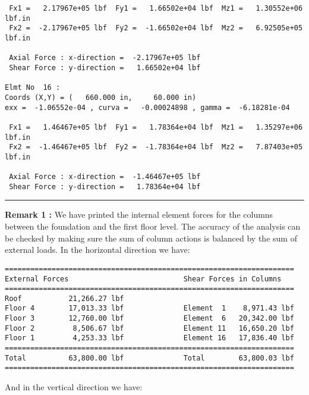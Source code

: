 \begin{footnotesize}
\begin{verbatim}
 Fx1 =   2.17967e+05 lbf  Fy1 =   1.66502e+04 lbf  Mz1 =   1.30552e+06 lbf.in
 Fx2 =  -2.17967e+05 lbf  Fy2 =  -1.66502e+04 lbf  Mz2 =   6.92505e+05 lbf.in

 Axial Force : x-direction =  -2.17967e+05 lbf
 Shear Force : y-direction =   1.66502e+04 lbf

Elmt No  16 : 
Coords (X,Y) = (   660.000 in,     60.000 in)
exx =  -1.06552e-04 , curva =   -0.00024898 , gamma =  -6.18281e-04

 Fx1 =   1.46467e+05 lbf  Fy1 =   1.78364e+04 lbf  Mz1 =   1.35297e+06 lbf.in
 Fx2 =  -1.46467e+05 lbf  Fy2 =  -1.78364e+04 lbf  Mz2 =   7.87403e+05 lbf.in

 Axial Force : x-direction =  -1.46467e+05 lbf
 Shear Force : y-direction =   1.78364e+04 lbf
\end{verbatim}
\rule{6.25 in}{0.035 in}
\end{footnotesize}

\vspace{0.15 in}\noindent
{\bf Remark 1 :} We have printed the internal element forces for the
columns between the foundation and the first floor level. The accuracy of
the analysis can be checked by making sure the sum of column actions 
is balanced by the sum of external loads.
In the horizontal direction we have:

\begin{footnotesize}
\begin{verbatim}
====================================================================
External Forces                           Shear Forces in Columns
====================================================================
Roof           21,266.27 lbf                
Floor 4        17,013.33 lbf              Element  1    8,971.43 lbf
Floor 3        12,760.00 lbf              Element  6   20,342.00 lbf
Floor 2         8,506.67 lbf              Element 11   16,650.20 lbf
Floor 1         4,253.33 lbf              Element 16   17,836.40 lbf
====================================================================
Total          63,800.00 lbf              Total        63,800.03 lbf
====================================================================
\end{verbatim}
\end{footnotesize}

\vspace{0.15 in}\noindent
And in the vertical direction we have:


